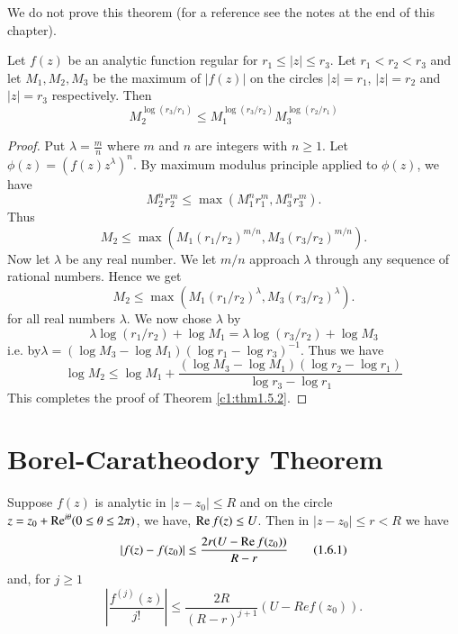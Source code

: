 \begin{remark*}
We do not prove this theorem (for a reference see the notes at the end of this chapter).
\end{remark*}

\begin{theorem}[HADAMARD]\label{c1:thm1.5.2}
Let $f(z)$ be an analytic function regular for $r_1 \leq |z| \leq r_3$. Let $r_1 < r_2 < r_3$ and let $M_1, M_2, M_3$ be the maximum of $|f(z)|$ on the circles $|z| = r_1$, $|z| = r_2$ and $|z| = r_3$ respectively. Then
$$
M^{\log (r_3/ r_1)}_2 \leq M^{\log (r_3 /r_2)}_1 M^{\log (r_2/r_1)}_3
$$
\end{theorem}

\begin{proof}
Put $\lambda =\frac{m}{n}$ where $m$ and $n$ are integers with $n \geq 1$. Let $\phi (z) = (f(z) z^{\lambda})^{n}$. By maximum modulus principle applied to $\phi(z)$, we have
$$
M^{n}_2 r^m_2 \leq \max (M^{n}_1 r^m_1 , M^{n}_3 r^m_3).
$$
Thus
$$
M_2 \leq \max (M_1 (r_1/r_2)^{m/n}, M_3 (r_3/r_2)^{m/n}).
$$
Now let $\lambda$ be any real number. We let $m/n$ approach $\lambda$ through any sequence  of rational numbers. Hence we get
$$
M_2 \leq \max (M_1 (r_1 / r_2)^{\lambda}, M_3 (r_3/ r_2)^\lambda).
$$
for all real numbers $\lambda$. We now chose $\lambda$ by
$$
\lambda \log (r_1/r_2) + \log M_1 = \lambda \log (r_3/r_2) + \log M_3
$$
i.e. by\pageoriginale $\lambda = (\log M_3 - \log M_1) (\log r_1 - \log r_3)^{-1}$. Thus we have
$$
\log M_2 \leq \log M_1 + \frac{(\log M_3 - \log M_1) (\log r_2 - \log r_1)}{\log r_3 - \log r_1}
$$
This completes the proof of Theorem \ref{c1:thm1.5.2}.
\end{proof}

\section{Borel-Caratheodory Theorem}\label{c1:sec1.6}

\begin{theorem}\label{c1:thm1.6.1}
Suppose $f(z)$ is analytic in $|z-z_0| \leq R$ and on the circle $z=z_0 + \operatorname{Re}^{i\theta} (0 \leq \theta \leq 2 \pi)$, we have, $\operatorname{Re} f(z) \leq U$. Then in $|z-z_0| \leq r < R$ we have
\begin{equation*}
|f(z) - f(z_0)| \leq \frac{2r(U -\operatorname{Re} f(z_0))}{R-r} \tag{1.6.1}\label{c1:eq1.6.1}
\end{equation*}
and, for $j\geq 1$
\begin{equation*}
|\frac{f^{(j)} (z)}{j!}| \leq \frac{2R}{(R-r)^{j+1}} (U-Re f(z_0)). \tag{1.6.2}\label{c1:eq1.6.2}
\end{equation*}
\end{theorem}

